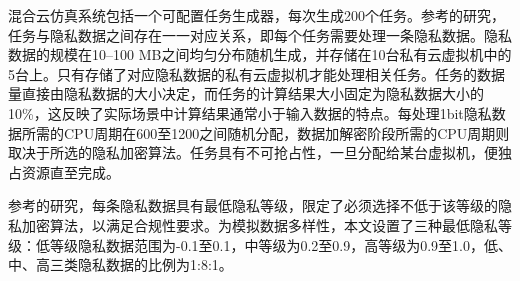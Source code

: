 混合云仿真系统包括一个可配置任务生成器，每次生成200个任务。参考\parencite{kchaouPSOTaskScheduling2022}的研究，任务与隐私数据之间存在一一对应关系，即每个任务需要处理一条隐私数据。隐私数据的规模在10–100 MB之间均匀分布随机生成，并存储在10台私有云虚拟机中的5台上。只有存储了对应隐私数据的私有云虚拟机才能处理相关任务。任务的数据量直接由隐私数据的大小决定，而任务的计算结果大小固定为隐私数据大小的10\%，这反映了实际场景中计算结果通常小于输入数据的特点\cite{leiPrivacySecurityawareWorkflow2022}。每处理1bit隐私数据所需的CPU周期在600至1200之间随机分配，数据加解密阶段所需的CPU周期则取决于所选的隐私加密算法。任务具有不可抢占性，一旦分配给某台虚拟机，便独占资源直至完成。

参考\parencite{zhuTaskSchedulingMultiCloud2021}的研究，每条隐私数据具有最低隐私等级，限定了必须选择不低于该等级的隐私加密算法，以满足合规性要求。为模拟数据多样性，本文设置了三种最低隐私等级：低等级隐私数据范围为-0.1至0.1，中等级为0.2至0.9，高等级为0.9至1.0，低、中、高三类隐私数据的比例为1:8:1。




